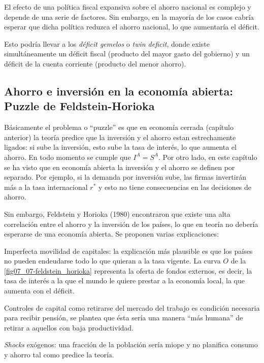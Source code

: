 \documentclass[DeGregorioResumen]{subfiles}
\begin{document}

El efecto de una política fiscal expansiva sobre el ahorro nacional es complejo y depende de una serie de factores. Sin embargo, en la mayoría de los casos cabría esperar que dicha política reduzca el ahorro nacional, lo que aumentaría el déficit.

Esto podría llevar a los \emph{déficit gemelos} o \emph{twin deficit}, donde existe simultáneamente un déficit fiscal (producto del mayor gasto del gobierno) y un déficit de la cuenta corriente (producto del menor ahorro).

\subsection{Ahorro e inversión en la economía abierta:\\ Puzzle de Feldstein-Horioka}

Básicamente el problema o ``puzzle'' es que en economía cerrada (capítulo anterior) la teoría predice que la inversión y el ahorro estan estrechamente ligados: si sube la inversión, esto sube la tasa de interés, lo que aumenta el ahorro. En todo momento se cumple que $I^A=S^A$. Por otro lado, en este capítulo se ha visto que en economía abierta la inversión y el ahorro se definen por separado. Por ejemplo, si la demanda por inversión sube, las firmas invertirán más a la tasa internacional $r^*$ y esto no tiene consecuencias en las decisiones de ahorro.

Sin embargo, Feldstein y Horioka (1980) encontraron que existe una alta correlación entre el ahorro y la inversión de los países, lo que en teoría no debería esperarse de una economía abierta. Se proponen varias explicaciones:

\begin{enumdescript}
\item [Imperfecta movilidad de capitales:] la explicación más plausible es que los países no pueden endeudarse todo lo que quieran a la tasa vigente. La curva $O$ de la \autoref{fig07_07-feldstein_horioka} representa la oferta de fondos externos, es decir, la tasa de interés a la que el mundo le quiere prestar a la economía local, la que aumenta con el déficit.
\item [Controles de capital] como retirarse del mercado del trabajo es condición necesaria para recibir pensión, se plantea que ésta sería una manera ``más humana'' de retirar a aquellos con baja productividad.
\item [\textit{Shocks} exógenos:] una fracción de la población sería miope y no planifica consumo y ahorro tal como predice la teoría.
\end{enumdescript}
\end{document}
